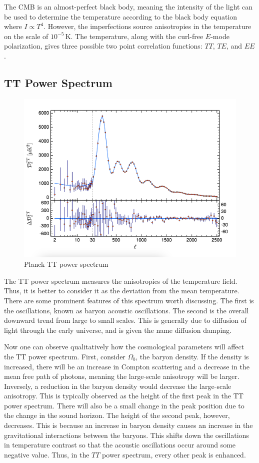 The CMB is an almost-perfect black body, meaning the intensity of the light can be used to determine the temperature according to the black body equation where $I \propto T^4$. However, the imperfections source anisotropies in the temperature on the scale of $10^{-5}\,\mathrm{K}$. The temperature, along with the curl-free $E$-mode polarization, gives three possible two point correlation functions: $TT$, $TE$, and $EE$.
\subsection{TT Power Spectrum}
\begin{figure}
    \centering
    \includegraphics[width=12cm]{plots/Planck_TT.png}
    \caption{Planck TT power spectrum}
    \label{fig:planck_tt}
\end{figure}
The TT power spectrum measures the anisotropies of the temperature field. Thus, it is better to consider it as the deviation from the mean temperature. There are some prominent features of this spectrum worth discussing. The first is the oscillations, known as baryon acoustic oscillations. The second is the overall downward trend from large to small scales. This is generally due to diffusion of light through the early universe, and is given the name diffusion damping.

Now one can observe qualitatively how the cosmological parameters will affect the TT power spectrum. First, consider $\Omega_b$, the baryon density. If the density is increased, there will be an increase in Compton scattering and a decrease in the mean free path of photons, meaning the large-scale anisotropy will be larger. Inversely, a reduction in the baryon density would decrease the large-scale anisotropy. This is typically observed as the height of the first peak in the TT power spectrum. There will also be a small change in the peak position due to the change in the sound horizon. The height of the second peak, however, decreases. This is because an increase in baryon density causes an increase in the gravitational interactions between the baryons. This shifts down the oscillations in temperature contrast so that the acoustic oscillations occur around some negative value. Thus, in the $TT$ power spectrum, every other peak is enhanced.

